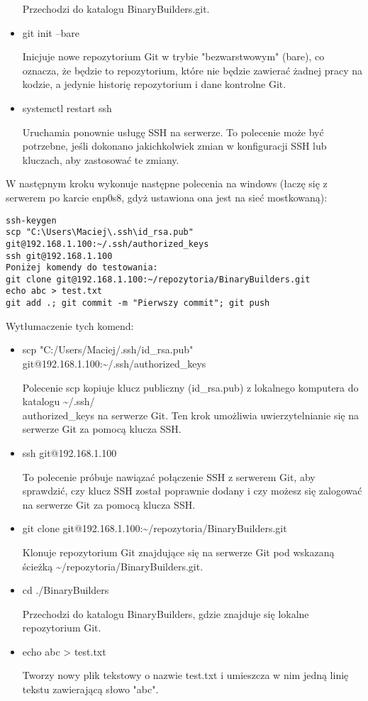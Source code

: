 \documentclass[a4paper]{article}
\begin{document}
\begin{itemize}
      Przechodzi do katalogu BinaryBuilders.git.
      
      \item git init --bare
      
      Inicjuje nowe repozytorium Git w trybie "bezwarstwowym" (bare), co oznacza, że będzie to repozytorium, które nie będzie zawierać żadnej pracy na kodzie, a jedynie historię repozytorium i dane kontrolne Git.
      
      \item systemctl restart ssh
      
      Uruchamia ponownie usługę SSH na serwerze. To polecenie może być potrzebne, jeśli dokonano jakichkolwiek zmian w konfiguracji SSH lub kluczach, aby zastosować te zmiany.
\end{itemize}

\newpage
W następnym kroku wykonuje następne polecenia na windows (łaczę się z serwerem po karcie enp0s8, gdyż ustawiona ona jest na sieć mostkowaną):
\begin{Verbatim}[frame=single, breaklines=true]
ssh-keygen
scp "C:\Users\Maciej\.ssh\id_rsa.pub" git@192.168.1.100:~/.ssh/authorized_keys
ssh git@192.168.1.100
Poniżej komendy do testowania:
git clone git@192.168.1.100:~/repozytoria/BinaryBuilders.git
echo abc > test.txt
git add .; git commit -m "Pierwszy commit"; git push
\end{Verbatim}
Wytłumaczenie tych komend:
\begin{itemize}
\item scp "C:/Users/Maciej/.ssh/id\_rsa.pub" git@192.168.1.100:\textasciitilde/.ssh/authorized\_keys
    
    Polecenie scp kopiuje klucz publiczny (id\_rsa.pub) z lokalnego komputera do katalogu \textasciitilde/.ssh/\\authorized\_keys na serwerze Git. Ten krok umożliwia uwierzytelnianie się na serwerze Git za pomocą klucza SSH.
    
    \item ssh git@192.168.1.100
    
    To polecenie próbuje nawiązać połączenie SSH z serwerem Git, aby sprawdzić, czy klucz SSH został poprawnie dodany i czy możesz się zalogować na serwerze Git za pomocą klucza SSH.
    
    \item git clone git@192.168.1.100:\textasciitilde/repozytoria/BinaryBuilders.git
    
    Klonuje repozytorium Git znajdujące się na serwerze Git pod wskazaną ścieżką \textasciitilde/repozytoria/BinaryBuilders.git.
    
    \item cd ./BinaryBuilders
    
    Przechodzi do katalogu BinaryBuilders, gdzie znajduje się lokalne repozytorium Git.
    
    \item echo abc > test.txt
    
    Tworzy nowy plik tekstowy o nazwie test.txt i umieszcza w nim jedną linię tekstu zawierającą słowo "abc".
\end{itemize}
\end{document}
